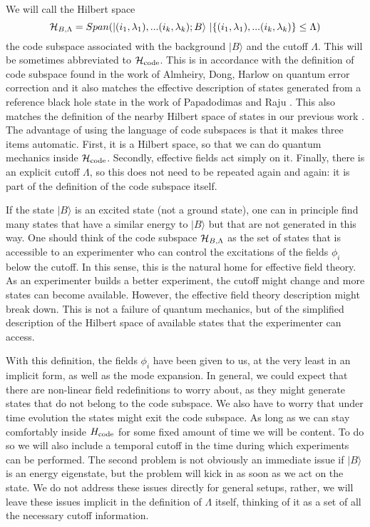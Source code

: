 \documentclass[12pt,nofootinbib, longbibliography]{revtex4-1}
\newcommand\ket[1]{| #1\rangle}
\begin{document}
 We will call the Hilbert space 
\begin{equation}
{\cal H}_{B, \Lambda}= Span(\ket{(i_1,\lambda_1),...(i_k,\lambda_k);B} \ | \{(i_1,\lambda_1),...(i_k,\lambda_k)\} \leq \Lambda  )
\end{equation}
the code subspace associated with the background $\ket B$ and the cutoff $\Lambda$. This will be sometimes abbreviated to ${\cal H}_{\rm{code}}$. 
This is in accordance with the definition of code subspace found in the work of Almheiry, Dong, Harlow \cite{Almheiri:2014lwa} on quantum error correction and it also matches the effective description 
of states generated from a reference black hole state in the work of Papadodimas and Raju \cite{Papadodimas:2013jku,Papadodimas:2015jra}. This also matches the definition of the nearby Hilbert space of states in our previous work \cite{Berenstein:2017abm}.
The advantage of using the language of code subspaces is that it makes three items automatic. First, it is a Hilbert space, so that we can do quantum mechanics inside ${\cal H}_{\rm{code}}$. Secondly, effective fields act simply on it. Finally, there is an explicit cutoff $\Lambda$, so this does not need to be repeated again and again: it is part of the definition of the code subspace itself.

If the state $\ket B$ is an  excited state (not a ground state), one can in principle find many states that have a similar energy to $\ket B$ but that are not generated in this way. One should think of the
code subspace ${\cal H}_{B, \Lambda}$ as the set of states that is accessible to an experimenter who can control the excitations of the fields $\phi_i$ below the cutoff. In this sense, this is the natural 
home for effective field theory. As an experimenter builds a better experiment, the cutoff might change and more states can become available. However, the effective field theory description might break down. This is not a failure of quantum mechanics, but of the simplified description of the Hilbert space of available states that the experimenter can access.

With this definition, the fields $\phi_i$ have been given to us, at the very least  in an implicit form,  as well as the mode expansion.  In general, we could expect that there are non-linear field redefinitions to worry about, as they might generate states that do not belong to the code subspace. We also have to worry that under time evolution the states might exit the code subspace. As long as we can stay comfortably inside $H_{\rm{code}}$ for some fixed amount of time we will be content. To do so we  will also include a temporal cutoff in the time during which experiments can be performed. The second problem  is not obviously an immediate issue if $\ket B$ is an energy eigenstate, but the problem will kick in as soon as we act on the state. 
We do not address these issues directly for general setups, rather, we will leave these issues implicit in the definition of $\Lambda$ itself, thinking of it as a set of all the necessary cutoff information.
\end{document}

